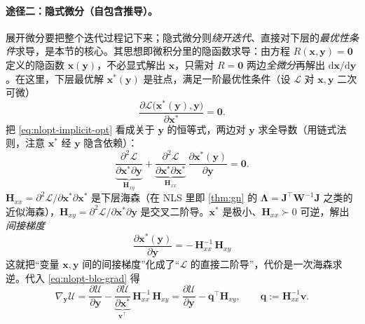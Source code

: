 \paragraph{途径二：隐式微分（自包含推导）。}\cite{carlone2026handbook}
展开微分要把整个迭代过程记下来；隐式微分则\emph{绕开迭代}、直接对下层的\emph{最优性条件}求导，是本节的核心。其思想即微积分里的隐函数求导：由方程 $R(\mathbf{x},\mathbf{y})=\mathbf{0}$ 定义的隐函数 $\mathbf{x}(\mathbf{y})$，不必显式解出 $\mathbf{x}$，只需对 $R=\mathbf{0}$ 两边\emph{全微分}再解出 $\mathrm{d}\mathbf{x}/\mathrm{d}\mathbf{y}$。在这里，下层最优解 $\mathbf{x}^*(\mathbf{y})$ 是驻点，满足一阶最优性条件（设 $\mathcal{L}$ 对 $\mathbf{x},\mathbf{y}$ 二次可微）
\begin{equation}
  \frac{\partial\mathcal{L}\big(\mathbf{x}^*(\mathbf{y}),\mathbf{y}\big)}{\partial\mathbf{x}^*}=\mathbf{0}.
  \label{eq:nlopt-implicit-opt}
\end{equation}
把 \cref{eq:nlopt-implicit-opt} 看成关于 $\mathbf{y}$ 的恒等式，两边对 $\mathbf{y}$ 求全导数（用链式法则，注意 $\mathbf{x}^*$ 经 $\mathbf{y}$ 隐含依赖）：
\begin{equation}
  \underbrace{\frac{\partial^2\mathcal{L}}{\partial\mathbf{x}^*\partial\mathbf{y}}}_{\textstyle\mathbf{H}_{xy}}
  +\underbrace{\frac{\partial^2\mathcal{L}}{\partial\mathbf{x}^*\partial\mathbf{x}^*}}_{\textstyle\mathbf{H}_{xx}}\,
  \frac{\partial\mathbf{x}^*(\mathbf{y})}{\partial\mathbf{y}}=\mathbf{0}.
  \label{eq:nlopt-implicit-totaldiff}
\end{equation}
$\mathbf{H}_{xx}=\partial^2\mathcal{L}/\partial\mathbf{x}^*\partial\mathbf{x}^*$ 是下层海森（在 NLS 里即 \cref{thm:gn} 的 $\boldsymbol{\Lambda}=\mathbf{J}^\top\mathbf{W}^{-1}\mathbf{J}$ 之类的近似海森），$\mathbf{H}_{xy}=\partial^2\mathcal{L}/\partial\mathbf{x}^*\partial\mathbf{y}$ 是交叉二阶导。$\mathbf{x}^*$ 是极小、$\mathbf{H}_{xx}\succ0$ 可逆，解出\emph{间接梯度}
\begin{equation}
  \boxed{\ \frac{\partial\mathbf{x}^*(\mathbf{y})}{\partial\mathbf{y}}=-\,\mathbf{H}_{xx}^{-1}\,\mathbf{H}_{xy}\ }
  \label{eq:nlopt-implicit-grad}
\end{equation}
这就把“变量 $\mathbf{x},\mathbf{y}$ 间的间接梯度”化成了“$\mathcal{L}$ 的直接二阶导”，代价是一次海森求逆。代入 \cref{eq:nlopt-blo-grad} 得
\begin{equation}
  \nabla_{\mathbf{y}}\mathcal{U}
  =\frac{\partial\mathcal{U}}{\partial\mathbf{y}}
  -\underbrace{\frac{\partial\mathcal{U}}{\partial\mathbf{x}^*}}_{\textstyle\mathbf{v}^\top}\,
  \mathbf{H}_{xx}^{-1}\,\mathbf{H}_{xy}
  =\frac{\partial\mathcal{U}}{\partial\mathbf{y}}-\mathbf{q}^\top\mathbf{H}_{xy},
  \qquad \mathbf{q}:=\mathbf{H}_{xx}^{-1}\mathbf{v}.
  \label{eq:nlopt-implicit-final}
\end{equation}

